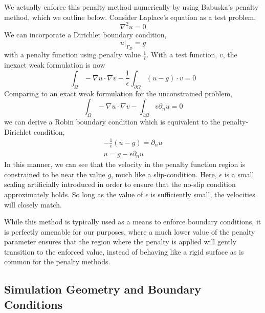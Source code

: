We actually enforce this penalty method numerically by using Babuska's
penalty method\cite{1973fempen,ZAMM:ZAMM19880680925}, which we outline below. 
Consider Laplace's equation as a test problem, 
\begin{equation}
 \nabla^2 u = 0 
\end{equation}
We can incorporate a Dirichlet boundary condition, 
\begin{equation}
 u|_{\Gamma_D} = g
\end{equation}
with a penalty function using penalty value $\frac{1}{\epsilon}$.
With a test function, $v$, the inexact weak formulation is now
\begin{equation}
\int_{\Omega}  - \nabla u \cdot \nabla v - \frac{1}{\epsilon}
 \int_{\partial \Omega} (u-g) \cdot v = 0 
\end{equation}
Comparing to an exact weak formulation for the unconstrained problem, 
\begin{equation}
\int_{\Omega}  - \nabla u \cdot \nabla v - 
 \int_{\partial \Omega} v \partial_n u = 0 
\end{equation}
we can derive a Robin boundary condition which is equivalent to the
penalty-Dirichlet condition,
\begin{align}
-\frac{1}{\epsilon}(u-g) = \partial_n u \\
 u = g - \epsilon \partial_n u 
\end{align}
In this manner, we can see that the velocity in the penalty function
region is constrained to be near the value $g$, much like a
slip-condition. Here, $\epsilon$ is a small
scaling artificially introduced in order to ensure that the no-slip
condition approximately holds. So long as the value of $\epsilon$ is
sufficiently small, the velocities will closely match. 

While this method is typically used as a means to enforce boundary
conditions, it is perfectly amenable for our purposes, where a much lower
value of the penalty parameter ensures that the region where the penalty
is applied will gently transition to the enforced value, instead of
behaving like a rigid surface as is common for the penalty methods.

\subsection{Simulation Geometry and Boundary Conditions}
\label{sec:bc}

%
%

